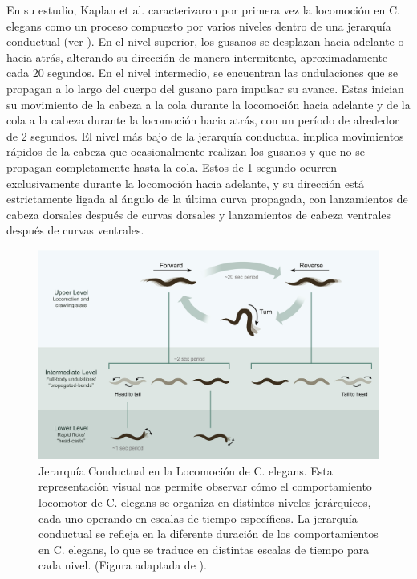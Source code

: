 En su estudio, Kaplan et al.   caracterizaron por primera vez la locomoción en C. elegans como un proceso compuesto por varios niveles dentro de una jerarquía conductual (ver ).  En el nivel superior, los gusanos se desplazan hacia adelante o hacia atrás, alterando su dirección de manera intermitente, aproximadamente cada 20 segundos. En el nivel intermedio, se encuentran las ondulaciones que se propagan a lo largo del cuerpo del gusano para impulsar su avance. Estas  inician su movimiento de la cabeza a la cola durante la locomoción hacia adelante y de la cola a la cabeza durante la locomoción hacia atrás, con un período de alrededor de 2 segundos. El nivel más bajo de la jerarquía conductual implica movimientos rápidos de la cabeza que ocasionalmente realizan los gusanos y que no se propagan completamente hasta la cola. Estos  de 1 segundo ocurren exclusivamente durante la locomoción hacia adelante, y su dirección está estrictamente ligada al ángulo de la última curva propagada, con lanzamientos de cabeza dorsales después de curvas dorsales y lanzamientos de cabeza ventrales después de curvas ventrales.




\begin{figure}[h!]
	\centering\includegraphics[width=\imsize]{kaplan1.jpg}
	\caption[Jerarquía Conductual en la Locomoción de C. elegans.]{ Jerarquía Conductual en la Locomoción de C. elegans. Esta representación visual nos permite observar cómo el comportamiento locomotor de C. elegans se organiza en distintos niveles jerárquicos, cada uno operando en escalas de tiempo específicas. La jerarquía conductual se refleja en la diferente duración de los comportamientos en C. elegans, lo que se traduce en distintas escalas de tiempo para cada nivel.	 (Figura adaptada de \protect\cite{hollon_neural_2020}). }\label{fig:kaplan1}
\end{figure}


